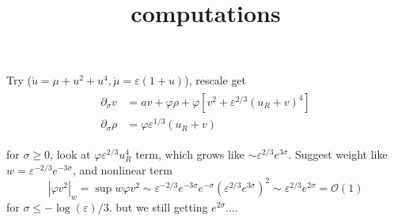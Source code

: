 \documentclass[letterpaper,11pt]{article}
\title{computations}
\newcommand{\rmO}{\mathcal{O}}
\newcommand{\eps}{\varepsilon}
\numberwithin{equation}{section}
\theoremstyle{plain}
\theoremstyle{remark}
\begin{document}
\maketitle
Try ($\dot{u} = \mu + u^2+u^4, \dot{\mu}=\eps(1+u)$), rescale get
\begin{align} 
\begin{split}
\partial_\sigma v &= a v + \varphi \rho + \varphi [v^2 + \eps^{2/3}(u_R+v)^4] \\
\partial_\sigma \rho &=  \varphi\eps^{1/3}(u_R+v)
\end{split}
\end{align}

 for $\sigma \ge 0$, look at $\varphi\eps^{2/3}u_R^4$ term, which grows like  $\sim \eps^{2/3}e^{3\sigma}$. Suggest weight like $w=\eps^{-2/3}e^{-3\sigma}$, and nonlinear term 
 \[
| \varphi v^2|_w  = \sup w\varphi v^2 \sim \eps^{-2/3}e^{-3\sigma} e^{-\sigma} (\eps^{2/3}e^{3\sigma})^2 \sim \eps^{2/3} e^{2\sigma} = \rmO(1)
 \]
 for $\sigma \le -\log(\eps)/3$. but we still getting $e^{2\sigma}$....
\end{document}
